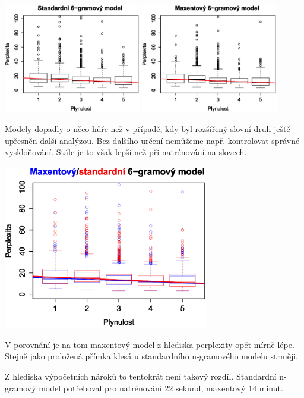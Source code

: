 \documentclass[12pt,a4paper]{report}
\begin{document}
\begin{center}
	\includegraphics[width=60mm]{./grafy/morf/ngram/rsd.svg.eps}
	\includegraphics[width=60mm]{./grafy/morf/maxent/rsd.svg.eps}
\end{center}
Modely dopadly o něco hůře než v případě, kdy byl rozšířený slovní druh ještě upřesněn další analýzou. Bez dalšího určení nemůžeme např. kontrolovat správné vyskloňování. Stále je to však lepší než při natrénování na slovech.
\begin{center}
	\includegraphics[width=90mm]{./grafy/morf/porovnani/rsd.svg.eps}	
\end{center}
V porovnání je na tom maxentový model z hlediska perplexity opět mírně lépe. Stejně jako proložená přímka klesá u standardního n-gramového modelu strměji.

Z hlediska výpočetních nároků to tentokrát není takový rozdíl. Standardní n-gramový model potřeboval pro natrénování 22 sekund, maxentový 14 minut.
\end{document}
